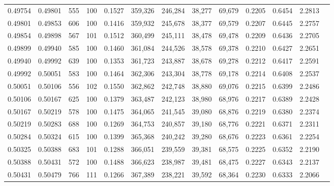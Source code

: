 \begin{tabular}{rrrrrrrrrrrrr}
0.49754 & 0.49801 &   555 & 100 &                                     0.1527 & 359,326 & 246,284 &  38,277 &  69,679 & 0.2205 & 0.6454 & 2.2813 \\
0.49801 & 0.49853 &   606 & 100 &                                     0.1416 & 359,932 & 245,678 &  38,377 &  69,579 & 0.2207 & 0.6445 & 2.2757 \\
0.49854 & 0.49898 &   567 & 101 &                                     0.1512 & 360,499 & 245,111 &  38,478 &  69,478 & 0.2209 & 0.6436 & 2.2705 \\
0.49899 & 0.49940 &   585 & 100 &                                     0.1460 & 361,084 & 244,526 &  38,578 &  69,378 & 0.2210 & 0.6427 & 2.2651 \\
0.49940 & 0.49992 &   639 & 100 &                                     0.1353 & 361,723 & 243,887 &  38,678 &  69,278 & 0.2212 & 0.6417 & 2.2591 \\
0.49992 & 0.50051 &   583 & 100 &                                     0.1464 & 362,306 & 243,304 &  38,778 &  69,178 & 0.2214 & 0.6408 & 2.2537 \\
0.50051 & 0.50106 &   556 & 102 &                                     0.1550 & 362,862 & 242,748 &  38,880 &  69,076 & 0.2215 & 0.6399 & 2.2486 \\
0.50106 & 0.50167 &   625 & 100 &                                     0.1379 & 363,487 & 242,123 &  38,980 &  68,976 & 0.2217 & 0.6389 & 2.2428 \\
0.50167 & 0.50219 &   578 & 100 &                                     0.1475 & 364,065 & 241,545 &  39,080 &  68,876 & 0.2219 & 0.6380 & 2.2374 \\
0.50219 & 0.50283 &   688 & 100 &                                     0.1269 & 364,753 & 240,857 &  39,180 &  68,776 & 0.2221 & 0.6371 & 2.2311 \\
0.50284 & 0.50324 &   615 & 100 &                                     0.1399 & 365,368 & 240,242 &  39,280 &  68,676 & 0.2223 & 0.6361 & 2.2254 \\
0.50325 & 0.50388 &   683 & 101 &                                     0.1288 & 366,051 & 239,559 &  39,381 &  68,575 & 0.2225 & 0.6352 & 2.2190 \\
0.50388 & 0.50431 &   572 & 100 &                                     0.1488 & 366,623 & 238,987 &  39,481 &  68,475 & 0.2227 & 0.6343 & 2.2137 \\
0.50431 & 0.50479 &   766 & 111 &                                     0.1266 & 367,389 & 238,221 &  39,592 &  68,364 & 0.2230 & 0.6333 & 2.2066 \\

\end{tabular}
